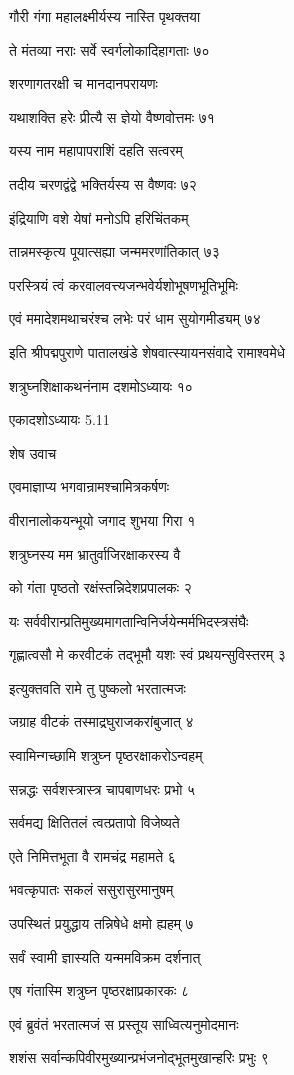 गौरी गंगा महालक्ष्मीर्यस्य नास्ति पृथक्तया

ते मंतव्या नराः सर्वे स्वर्गलोकादिहागताः ७०

शरणागतरक्षी च मानदानपरायणः

यथाशक्ति हरेः प्रीत्यै स ज्ञेयो वैष्णवोत्तमः ७१

यस्य नाम महापापराशिं दहति सत्वरम्

तदीय चरणद्वंद्वे भक्तिर्यस्य स वैष्णवः ७२

इंद्रियाणि वशे येषां मनोऽपि हरिचिंतकम्

तान्नमस्कृत्य पूयात्सह्या जन्ममरणांतिकात् ७३

परस्त्रियं त्वं करवालवत्त्यजन्भवेर्यशोभूषणभूतिभूमिः

एवं ममादेशमथाचरंश्च लभेः परं धाम सुयोगमीड्यम् ७४

इति श्रीपद्मपुराणे पातालखंडे शेषवात्स्यायनसंवादे रामाश्वमेधे

शत्रुघ्नशिक्षाकथनंनाम दशमोऽध्यायः १०

एकादशोऽध्यायः 5.11

शेष उवाच

एवमाज्ञाप्य भगवान्रामश्चामित्रकर्षणः

वीरानालोकयन्भूयो जगाद शुभया गिरा १

शत्रुघ्नस्य मम भ्रातुर्वाजिरक्षाकरस्य वै

को गंता पृष्ठतो रक्षंस्तन्निदेशप्रपालकः २

यः सर्ववीरान्प्रतिमुख्यमागतान्विनिर्जयेन्मर्मभिदस्त्रसंघैः

गृह्णात्वसौ मे करवीटकं तद्भूमौ यशः स्वं प्रथयन्सुविस्तरम् ३

इत्युक्तवति रामे तु पुष्कलो भरतात्मजः

जग्राह वीटकं तस्माद्रघुराजकरांबुजात् ४

स्वामिन्गच्छामि शत्रुघ्न पृष्ठरक्षाकरोऽन्वहम्

सन्नद्धः सर्वशस्त्रास्त्र चापबाणधरः प्रभो ५

सर्वमद्य क्षितितलं त्वत्प्रतापो विजेष्यते

एते निमित्तभूता वै रामचंद्र महामते ६

भवत्कृपातः सकलं ससुरासुरमानुषम्

उपस्थितं प्रयुद्धाय तन्निषेधे क्षमो ह्यहम् ७

सर्वं स्वामी ज्ञास्यति यन्ममविक्रम दर्शनात्

एष गंतास्मि शत्रुघ्न पृष्ठरक्षाप्रकारकः ८

एवं ब्रुवंतं भरतात्मजं स प्रस्तूय साध्वित्यनुमोदमानः

शशंस सर्वान्कपिवीरमुख्यान्प्रभंजनोद्भूतमुखान्हरिः प्रभुः ९

